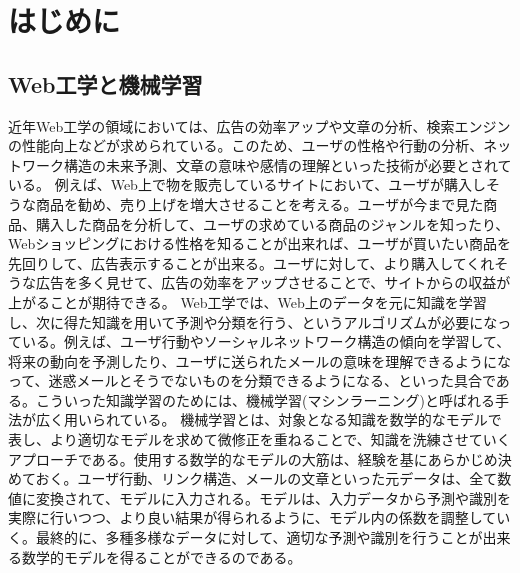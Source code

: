 \chapter{はじめに}
\label{chap:preface}
\section{Web工学と機械学習}
近年Web工学の領域においては、広告の効率アップや文章の分析、検索エンジンの性能向上などが求められている。このため、ユーザの性格や行動の分析、ネットワーク構造の未来予測、文章の意味や感情の理解といった技術が必要とされている。
例えば、Web上で物を販売しているサイトにおいて、ユーザが購入しそうな商品を勧め、売り上げを増大させることを考える。ユーザが今まで見た商品、購入した商品を分析して、ユーザの求めている商品のジャンルを知ったり、Webショッピングにおける性格を知ることが出来れば、ユーザが買いたい商品を先回りして、広告表示することが出来る。ユーザに対して、より購入してくれそうな広告を多く見せて、広告の効率をアップさせることで、サイトからの収益が上がることが期待できる。
Web工学では、Web上のデータを元に知識を学習し、次に得た知識を用いて予測や分類を行う、というアルゴリズムが必要になっている。例えば、ユーザ行動やソーシャルネットワーク構造の傾向を学習して、将来の動向を予測したり、ユーザに送られたメールの意味を理解できるようになって、迷惑メールとそうでないものを分類できるようになる、といった具合である。こういった知識学習のためには、機械学習(マシンラーニング)と呼ばれる手法が広く用いられている。
機械学習とは、対象となる知識を数学的なモデルで表し、より適切なモデルを求めて微修正を重ねることで、知識を洗練させていくアプローチである。使用する数学的なモデルの大筋は、経験を基にあらかじめ決めておく。ユーザ行動、リンク構造、メールの文章といった元データは、全て数値に変換されて、モデルに入力される。モデルは、入力データから予測や識別を実際に行いつつ、より良い結果が得られるように、モデル内の係数を調整していく。最終的に、多種多様なデータに対して、適切な予測や識別を行うことが出来る数学的モデルを得ることができるのである。

